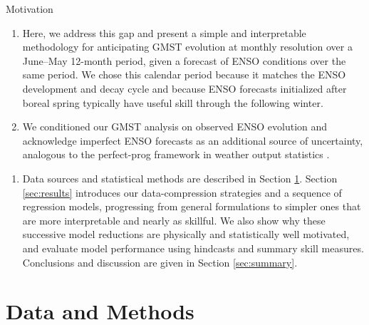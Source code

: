 \documentclass[aspectratio=169,xcolor=dvipsnames]{beamer}
\begin{document}
\begin{frame}{Motivation}
  \begin{enumerate}\tiny
  \item Here, we address this gap and present a simple and
    interpretable methodology for anticipating GMST evolution at
    monthly resolution over a June--May 12-month period, given a
    forecast of ENSO conditions over the same period.  We chose this
    calendar period because it matches the ENSO development and decay
    cycle and because ENSO forecasts initialized after boreal spring
    typically have useful skill through the following winter.

  \item We conditioned our GMST analysis on observed ENSO evolution and
    acknowledge imperfect ENSO forecasts as an additional source of
    uncertainty, analogous to the perfect-prog framework in weather
    output statistics \citep{Glahn72,Klein1959objective}.
  \end{enumerate}

  \begin{enumerate}\tiny
  \item Data sources and statistical methods are described in Section
    \ref{sec:data-methods}.  Section \ref{sec:results} introduces our
    data-compression strategies and a sequence of regression models,
    progressing from general formulations to simpler ones that are
    more interpretable and nearly as skillful. We also show why these
    successive model reductions are physically and statistically well
    motivated, and evaluate model performance using hindcasts and
    summary skill measures. Conclusions and discussion are given in
    Section \ref{sec:summary}.
  \end{enumerate}
\end{frame}



\section{Data and Methods}\label{sec:data-methods}
\end{document}

